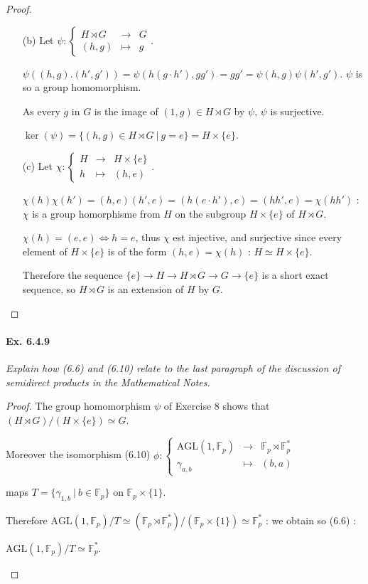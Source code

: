 \documentclass[11pt,a4paper]{article}
\newcommand{\F}{\mathbb{F}}
\begin{document}
\begin{proof}
\begin{enumerate}
\item[(b)]
Let
$
\psi : 
\left\{
\begin{array}{ccc}
  H\rtimes G &   \to & G  \\
  (h,g)& \mapsto   &  g 
\end{array}
\right.
$. 

$\psi((h,g).(h',g')) = \psi(h(g\cdot h'),gg') = gg' = \psi(h,g) \psi(h',g')$. $\psi$ is so a group homomorphism.

As every $g$ in $G$ is the image of $(1,g) \in   H\rtimes G$ by $\psi$, $\psi$ is surjective.

$\ker(\psi) = \{(h,g) \in   H\rtimes G \ \vert \ g=e\} = H \times \{e\}$.

\item[(c)]
Let
$
\chi : 
\left\{
\begin{array}{ccc}
  H &   \to & H \times \{e\}  \\
h& \mapsto   &  (h,e)
\end{array}
\right.
$. 

$\chi(h)\chi(h') = (h,e)(h',e) = (h (e\cdot h'), e) = (hh',e) = \chi(hh')$ : $\chi$ is a group homorphisme from $H$ on the subgroup $H\times \{e\}$ of $H \rtimes G$.

$\chi(h) = (e,e) \iff h=e$, thus $\chi$ est injective, and surjective since every element of $H\times\{e\}$ is of the form $(h,e) = \chi(h)$ : $H \simeq H\times \{e\}$.

Therefore the sequence  $\{e\} \to H \to H\rtimes G \to G \to \{e\}$ is a short exact sequence, so $H\rtimes G$ is an extension of $H$ by $G$.
\end{enumerate}
\end{proof}

\paragraph{Ex. 6.4.9}

{\it Explain how (6.6) and (6.10) relate to the last paragraph of the discussion of semidirect products in the Mathematical Notes.
}

\begin{proof}
The group homomorphism $\psi$ of Exercise 8 shows that $(H\rtimes G) / (H \times\{e\}) \simeq G$.

Moreover the isomorphism (6.10)
$
\phi : 
\left\{
\begin{array}{ccc}
  \mathrm{AGL}(1,\F_p)  &   \to & \F_p \rtimes \F_p^*  \\
 \gamma_{a,b}& \mapsto   &  (b,a) 
\end{array}
\right.
$

maps $T = \{\gamma_{1,b} \ \vert \ b \in \F_p\}$ on $\F_p \times \{1\}$.
 
Therefore $\mathrm{AGL}(1,\F_p)/T \simeq (\F_p \rtimes \F_p^*)/(\F_p \times \{1\}) \simeq \F_p^*$ : we obtain so (6.6) :
 \begin{center}
  $\mathrm{AGL}(1,\F_p)/T \simeq \F_p^*$.
\end{center}
\end{proof}
\end{document}
